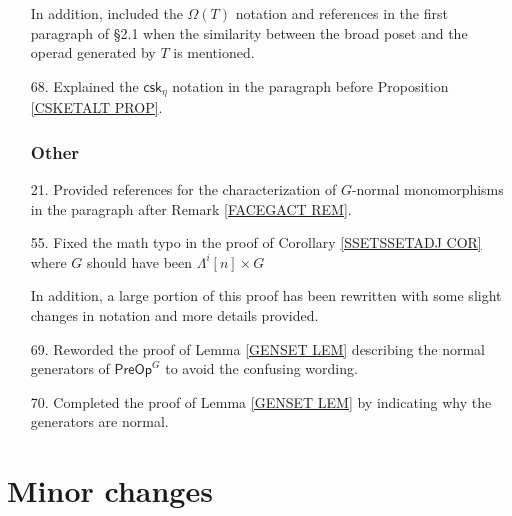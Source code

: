 \documentclass{article}
\begin{document}
\begin{itemize}
      In addition, included the $\Omega(T)$ notation and references in the first paragraph of \S 2.1 when the similarity between the broad poset and the operad generated by $T$ is mentioned. %

\item[68.] Explained the $\mathsf{csk}_{\eta}$ notation in the paragraph before Proposition \ref{CSKETALT PROP}. %
      

      
      \subsubsection*{Other}      


\item[21.] Provided references for the characterization of $G$-normal monomorphisms in the paragraph after Remark \ref{FACEGACT REM}. %


\item[55.] Fixed the math typo in the proof of Corollary \ref{SSETSSETADJ COR} where $G$ should have been $\Lambda^i[n] \times G$
      
      In addition, a large portion of this proof has been rewritten with some slight changes in notation and more details provided. %

      


      
\item[69.] Reworded the proof of Lemma \ref{GENSET LEM} describing the normal generators of $\mathsf{PreOp}^G$ to avoid the confusing wording. %

      
\item[70.] Completed the proof of Lemma \ref{GENSET LEM} by indicating why the generators are normal. %
 
                           
\end{itemize}



\section{Minor changes}
 
\end{document}
